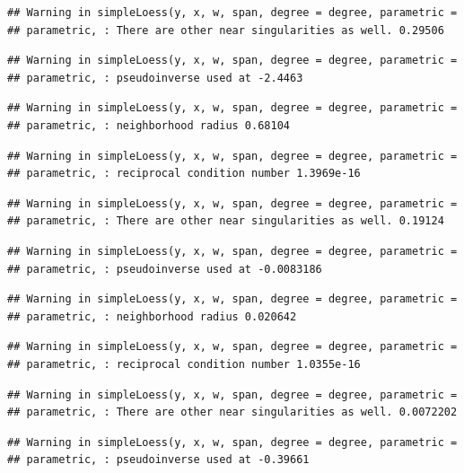 \documentclass[]{article}
\begin{document}
\begin{verbatim}
## Warning in simpleLoess(y, x, w, span, degree = degree, parametric =
## parametric, : There are other near singularities as well. 0.29506
\end{verbatim}

\begin{verbatim}
## Warning in simpleLoess(y, x, w, span, degree = degree, parametric =
## parametric, : pseudoinverse used at -2.4463
\end{verbatim}

\begin{verbatim}
## Warning in simpleLoess(y, x, w, span, degree = degree, parametric =
## parametric, : neighborhood radius 0.68104
\end{verbatim}

\begin{verbatim}
## Warning in simpleLoess(y, x, w, span, degree = degree, parametric =
## parametric, : reciprocal condition number 1.3969e-16
\end{verbatim}

\begin{verbatim}
## Warning in simpleLoess(y, x, w, span, degree = degree, parametric =
## parametric, : There are other near singularities as well. 0.19124
\end{verbatim}

\begin{verbatim}
## Warning in simpleLoess(y, x, w, span, degree = degree, parametric =
## parametric, : pseudoinverse used at -0.0083186
\end{verbatim}

\begin{verbatim}
## Warning in simpleLoess(y, x, w, span, degree = degree, parametric =
## parametric, : neighborhood radius 0.020642
\end{verbatim}

\begin{verbatim}
## Warning in simpleLoess(y, x, w, span, degree = degree, parametric =
## parametric, : reciprocal condition number 1.0355e-16
\end{verbatim}

\begin{verbatim}
## Warning in simpleLoess(y, x, w, span, degree = degree, parametric =
## parametric, : There are other near singularities as well. 0.0072202
\end{verbatim}

\begin{verbatim}
## Warning in simpleLoess(y, x, w, span, degree = degree, parametric =
## parametric, : pseudoinverse used at -0.39661
\end{verbatim}
\end{document}
